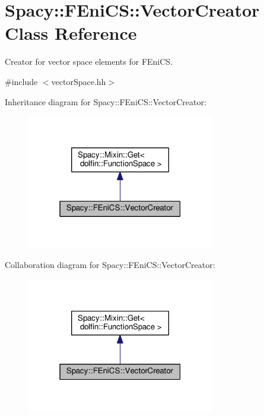 \hypertarget{classSpacy_1_1FEniCS_1_1VectorCreator}{}\section{Spacy\+:\+:F\+Eni\+C\+S\+:\+:Vector\+Creator Class Reference}
\label{classSpacy_1_1FEniCS_1_1VectorCreator}


Creator for vector space elements for F\+Eni\+C\+S.  




{\ttfamily \#include $<$vector\+Space.\+hh$>$}



Inheritance diagram for Spacy\+:\+:F\+Eni\+C\+S\+:\+:Vector\+Creator\+:\nopagebreak
\begin{figure}[H]
\begin{center}
\leavevmode
\includegraphics[width=232pt]{classSpacy_1_1FEniCS_1_1VectorCreator__inherit__graph}
\end{center}
\end{figure}


Collaboration diagram for Spacy\+:\+:F\+Eni\+C\+S\+:\+:Vector\+Creator\+:\nopagebreak
\begin{figure}[H]
\begin{center}
\leavevmode
\includegraphics[width=232pt]{classSpacy_1_1FEniCS_1_1VectorCreator__coll__graph}
\end{center}
\end{figure}
